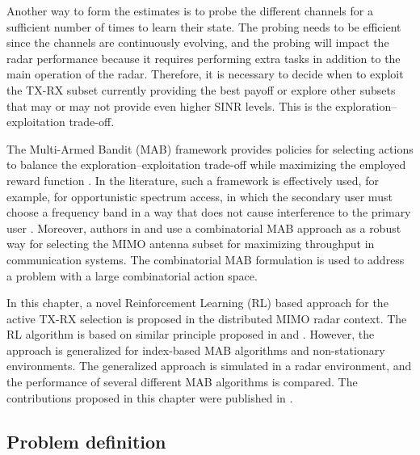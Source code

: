 \documentclass[english, 12pt, a4paper, elec, utf8, a-1b, online]{aaltothesis}
\numberwithin{equation}{section}
\begin{document}
Another way to form the estimates is to probe the different channels for a sufficient number of times to learn their state.
The probing needs to be efficient since the channels are continuously evolving, and the probing will impact the radar performance because it requires performing extra tasks in addition to the main operation of the radar.  Therefore, it is necessary to decide when to exploit the TX-RX subset currently providing the best payoff or explore other subsets that may or may not provide even higher SINR levels. 
This is the exploration--exploitation trade-off.

The Multi-Armed Bandit (MAB) framework provides policies for selecting actions to balance the exploration--exploitation trade-off while maximizing the employed reward function \cite{Lattimore2019}.
In the literature, such a framework is effectively used, for example, for opportunistic spectrum access, in which the secondary user must choose a frequency band in a way that does not cause interference to the primary user \cite{Zhao2008}.
Moreover, authors in \cite{Mukherjee2012} and \cite{Kuai2019} use a combinatorial MAB approach as a robust way for selecting the MIMO antenna subset for maximizing throughput in communication systems.
The combinatorial MAB formulation is used to address a problem with a large combinatorial action space.

In this chapter, a novel Reinforcement Learning (RL) based approach for the active TX-RX selection is proposed in the distributed MIMO radar context.
The RL algorithm is based on similar principle proposed in \cite{Mukherjee2012} and \cite{Kuai2019}. 
However, the approach is generalized for index-based MAB algorithms and non-stationary environments. 
The generalized approach is simulated in a radar environment, and the performance of several different MAB algorithms is compared.
The contributions proposed in this chapter were published in \cite{Pulkkinen2020}.


\subsection{Problem definition}

\newcommand{\ntx}{{N_{\text{tx}}}}
\newcommand{\nrx}{{N_{\text{rx}}}}
\newcommand{\srx}{{M_{\text{rx}}}}
\newcommand{\stx}{{M_{\text{tx}}}}
\end{document}
